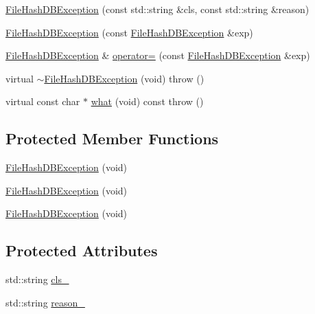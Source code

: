 \begin{DoxyCompactItemize}
\item 
\mbox{\hyperlink{classFILEDB_1_1FileHashDBException_ae549056e12f10f0bb24e0875a70ec57b}{File\+Hash\+D\+B\+Exception}} (const std\+::string \&cls, const std\+::string \&reason)
\item 
\mbox{\hyperlink{classFILEDB_1_1FileHashDBException_ad018a7bda0cfd93d2efac5c16c10886e}{File\+Hash\+D\+B\+Exception}} (const \mbox{\hyperlink{classFILEDB_1_1FileHashDBException}{File\+Hash\+D\+B\+Exception}} \&exp)
\item 
\mbox{\hyperlink{classFILEDB_1_1FileHashDBException}{File\+Hash\+D\+B\+Exception}} \& \mbox{\hyperlink{classFILEDB_1_1FileHashDBException_ac7678441c40ae0bf44d1156dbabd596a}{operator=}} (const \mbox{\hyperlink{classFILEDB_1_1FileHashDBException}{File\+Hash\+D\+B\+Exception}} \&exp)
\item 
virtual \mbox{\hyperlink{classFILEDB_1_1FileHashDBException_aacf132dca5ed0d1b8dc3e4694c77c190}{$\sim$\+File\+Hash\+D\+B\+Exception}} (void)  throw ()
\item 
virtual const char $\ast$ \mbox{\hyperlink{classFILEDB_1_1FileHashDBException_aa8588fe36ad351eb1c1f17db8b48d349}{what}} (void) const  throw ()
\end{DoxyCompactItemize}
\subsection*{Protected Member Functions}
\begin{DoxyCompactItemize}
\item 
\mbox{\hyperlink{classFILEDB_1_1FileHashDBException_a7cbe99c797d9edf2d2e123d3aacaba76}{File\+Hash\+D\+B\+Exception}} (void)
\item 
\mbox{\hyperlink{classFILEDB_1_1FileHashDBException_a7cbe99c797d9edf2d2e123d3aacaba76}{File\+Hash\+D\+B\+Exception}} (void)
\item 
\mbox{\hyperlink{classFILEDB_1_1FileHashDBException_a7cbe99c797d9edf2d2e123d3aacaba76}{File\+Hash\+D\+B\+Exception}} (void)
\end{DoxyCompactItemize}
\subsection*{Protected Attributes}
\begin{DoxyCompactItemize}
\item 
std\+::string \mbox{\hyperlink{classFILEDB_1_1FileHashDBException_a758ffa21cceee63da7f40d93c6e0c2b3}{cls\+\_\+}}
\item 
std\+::string \mbox{\hyperlink{classFILEDB_1_1FileHashDBException_a03d9f75945799fec0e00195daed5aaad}{reason\+\_\+}}
\end{DoxyCompactItemize}


